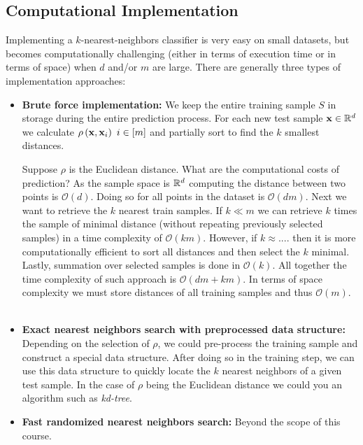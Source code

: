 \subsection{Computational Implementation}
Implementing a $k$-nearest-neighbors classifier is very easy on small datasets, but becomes computationally challenging (either in terms of execution time or in terms of space) when $d$ and/or $m$ are large. There are generally three types of implementation approaches:
~\\\begin{itemize}
	\item \textbf{Brute force implementation:} We keep the entire training sample $S$ in storage during the entire prediction process. For each new test sample $\mathbf{x}\in\mathbb{R}^d$ we calculate $\rho\left(\mathbf{x},\mathbf{x}_i\right)\,\,i\in\left[m\right]$ and partially sort to find the $k$ smallest distances.  
	
	Suppose $\rho$ is the Euclidean distance. What are the computational costs of prediction? As the sample space is $\mathbb{R}^d$ computing the distance between two points is $\mathcal{O}\left(d\right)$. Doing so for all points in the dataset is $\mathcal{O}\left(dm\right)$. Next we want to retrieve the $k$ nearest train samples. If $k\ll m$ we can retrieve $k$ times the sample of minimal distance (without repeating previously selected samples) in a time complexity of $\mathcal{O}\left(km\right)$. However, if $k\approx ....$ then it is more computationally efficient to sort all distances and then select the $k$ minimal. Lastly, summation over selected samples is done in $\mathcal{O}\left(k\right)$. All together the time complexity of such approach is $\mathcal{O}\left(dm+km\right)$. In terms of space complexity we must store distances of all training samples and thus $\mathcal{O}\left(m\right)$.
	~\\\item \textbf{Exact nearest neighbors search with preprocessed data structure:} Depending on the selection of $\rho$, we could pre-process the training sample and construct a special data structure. After doing so in the training step, we can use this data structure to quickly locate the $k$ nearest neighbors of a given test sample. In the case of $\rho$ being the Euclidean distance we could you an algorithm such as \textit{kd-tree}.
	~\\\item \textbf{Fast randomized nearest neighbors search:} Beyond the scope of this course. 
\end{itemize}

